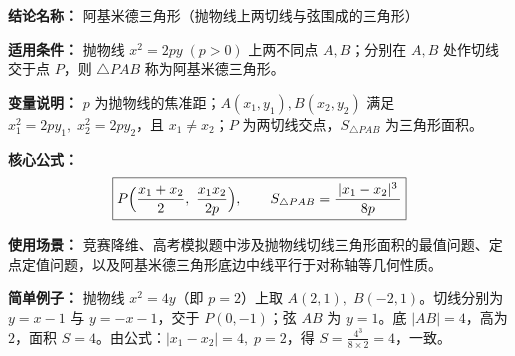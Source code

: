 \textbf{结论名称：} 阿基米德三角形（抛物线上两切线与弦围成的三角形）

\textbf{适用条件：} 抛物线 \( x^2=2py\;(p>0) \) 上两不同点 \( A,B \)；分别在 \( A,B \) 处作切线交于点 \( P \)，则 \( \triangle PAB \) 称为阿基米德三角形。

\textbf{变量说明：} \( p \) 为抛物线的焦准距；\( A(x_1,y_1), B(x_2,y_2) \) 满足 \( x_1^2=2py_1,\;x_2^2=2py_2 \)，且 \( x_1\neq x_2 \)；\( P \) 为两切线交点，\( S_{\triangle PAB} \) 为三角形面积。

\textbf{核心公式：}
\[
\boxed{P\Bigl(\frac{x_1+x_2}{2},\ \frac{x_1x_2}{2p}\Bigr),\qquad S_{\triangle PAB}=\frac{\,|x_1-x_2|^3\,}{8p}}
\]

\textbf{使用场景：} 竞赛降维、高考模拟题中涉及抛物线切线三角形面积的最值问题、定点定值问题，以及阿基米德三角形底边中线平行于对称轴等几何性质。

\textbf{简单例子：} 抛物线 \( x^2=4y \)（即 \( p=2 \)）上取 \( A(2,1),\;B(-2,1) \)。切线分别为 \( y=x-1 \) 与 \( y=-x-1 \)，交于 \( P(0,-1) \)；弦 \( AB \) 为 \( y=1 \)。底 \( |AB|=4 \)，高为 \( 2 \)，面积 \( S=4 \)。由公式：\( |x_1-x_2|=4,\;p=2 \)，得 \( S=\frac{4^3}{8\times 2}=4 \)，一致。